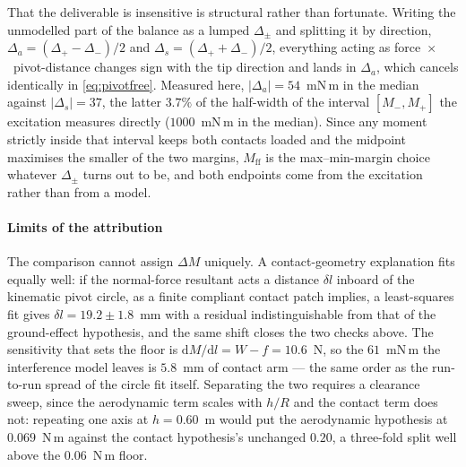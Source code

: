 That the deliverable is insensitive is structural rather than
fortunate. Writing the unmodelled part of the balance as a lumped
$\Delta_{\pm}$ and splitting it by direction,
$\Delta_a = (\Delta_+ - \Delta_-)/2$ and
$\Delta_s = (\Delta_+ + \Delta_-)/2$, everything acting as
force~$\times$~pivot-distance changes sign with the tip direction and
lands in $\Delta_a$, which cancels identically in
\eqref{eq:pivotfree}. Measured here, $|\Delta_a| = 54$~mN\,m in the
median against $|\Delta_s| = 37$, the latter $3.7\%$ of the half-width
of the interval $[M_-, M_+]$ the excitation measures directly
($1000$~mN\,m in the median). Since any moment strictly inside that
interval keeps both contacts loaded and the midpoint maximises the
smaller of the two margins, $M_{\mathrm{ff}}$ is the max--min-margin
choice whatever $\Delta_{\pm}$ turns out to be, and both endpoints
come from the excitation rather than from a model.

\paragraph{Limits of the attribution}
The comparison cannot assign $\Delta M$ uniquely. A contact-geometry
explanation fits equally well: if the normal-force resultant acts a
distance $\delta l$ inboard of the kinematic pivot circle, as a
finite compliant contact patch implies, a least-squares fit gives
$\delta l = 19.2 \pm 1.8$~mm with a residual indistinguishable from
that of the ground-effect hypothesis, and the same shift closes the
two checks above. The sensitivity that sets the floor is
$\mathrm{d}M/\mathrm{d}l = W - f = 10.6$~N, so the $61$~mN\,m the
interference model leaves is $5.8$~mm of contact arm --- the same
order as the run-to-run spread of the circle fit itself. Separating
the two requires a clearance sweep, since the aerodynamic term scales
with $h/R$ and the contact term does not: repeating one axis at
$h = 0.60$~m would put the aerodynamic hypothesis at $0.069$~N\,m
against the contact hypothesis's unchanged $0.20$, a three-fold split
well above the $0.06$~N\,m floor.
